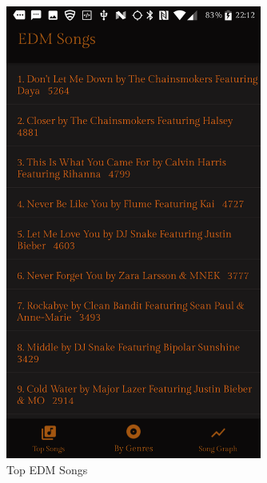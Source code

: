 \documentclass{article}
\begin{document}
\begin{figure}[H]
  \centering
  \begin{minipage}{.5\textwidth}
    \centering
    \includegraphics[width=0.75\textwidth]{EDMTop.png}
    \caption{Top EDM Songs}
    \label{label}
  \end{minipage}%
  \begin{minipage}{.5\textwidth}
    \centering

\end{minipage}
\end{figure}
\end{document}
